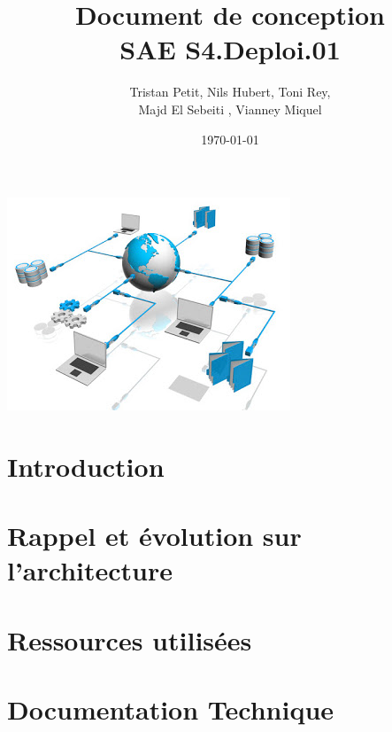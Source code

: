 \documentclass{article}
\begin{document}
\title{Document de conception \\ SAE S4.Deploi.01}
\author{Tristan Petit, Nils Hubert, Toni Rey,\\ 
 Majd El Sebeiti , Vianney Miquel}
\date{\today}
\maketitle
\begin{center}
    \vspace{1cm} %
    \includegraphics{Images/Logo-project.jpeg} %
\end{center}

\maketitle

\newpage
\renewcommand{\contentsname}{Table des matières}

\tableofcontents

\newpage
{}

\section{Introduction}



\section{Rappel et évolution sur l'architecture}



\section{Ressources utilisées}

\section{Documentation Technique}

%
\end{document}
